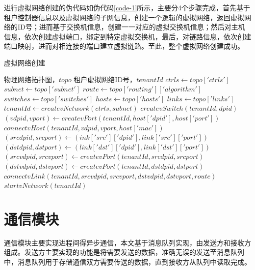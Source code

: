 进行虚拟网络创建的伪代码如伪代码\ref{code-1}所示，主要分4个步骤完成，首先基于租户控制器信息以及虚拟网络的子网信息，创建一个逻辑的虚拟网络，返回虚拟网络的ID号；进而基于交换机信息，创建一一对应的虚拟交换机信息；然后对主机信息，依次创建虚拟端口，绑定到特定虚拟交换机，最后，对链路信息，依次创建端口映射，进而对相连接的端口建立虚拟链路。至此，整个虚拟网络创建成功。

\begin{algorithm}[!htb]
    \caption{虚拟网络创建}
    \label{code-1}
    \begin{algorithmic}[1] %
        \Require 物理网络拓扑图，$topo$
        \Ensure 租户虚拟网络ID号，$tenantId$
            \State $ctrls \gets topo['ctrls']$
            \State $subnet \gets topo['subnet']$
            \State $route \gets topo['routing']['algorithm']$
            \State $switches \gets topo['switches']$
            \State $hosts \gets topo['hosts']$
            \State $links \gets topo['links']$
            \State $tenantId \gets createvNetwork(ctrls,subnet)$
            	\State $createvSwitch(tenantId, dpid)$
            \EndFor
            	\State $(vdpid, vport) \gets createvPort(tenantId, host['dpid'],host['port'])$
            	\State $connectvHost(tenantId, vdpid, vport, host['mac'])$
            \EndFor
            	\State$(srcdpid, srcport) \gets (ink['src']['dpid'], link['src']['port'])$
            	\State$(dstdpid, dstport) \gets (link['dst']['dpid'], link['dst']['port'])$
            	\State $(srcvdpid, srcvport) \gets createvPort(tenantId, srcdpid, srcport)$
            	\State $(dstvdpid, dstvport) \gets createvPort(tenantId, dstdpid, dstport)$
            	\State $connectvLink(tenantId, srcvdpid, srcvport, dstvdpid, dstvport, route)$
            \EndFor
            \State $startvNetwork(tenantId)$
            \State {}
        \EndFunction
    \end{algorithmic}
\end{algorithm}

\section{通信模块}
通信模块主要实现进程间得异步通信，本文基于消息队列实现，由发送方和接收方组成。发送方主要实现的功能是将需要发送的数据，准确无误的发送至消息队列中，消息队列用于存储通信双方需要传送的数据，直到接收方从队列中读取完成。

